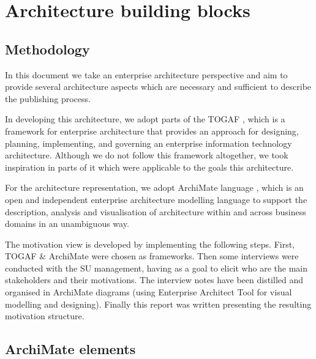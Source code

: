 \section{Architecture building blocks}
\label{sec:building-blocks}


	\subsection{Methodology}
	
	In this document we take an enterprise architecture perspective and aim to provide several architecture aspects which are necessary and sufficient to describe the publishing process. 
	
	In developing this architecture, we adopt parts of the TOGAF \citep{togaf9.2}, which is a framework for enterprise architecture that provides an approach for designing, planning, implementing, and governing an enterprise information technology architecture. Although we do not follow this framework altogether, we took inspiration in parts of it which were applicable to the goals this architecture.  
	
	For the architecture representation, we adopt ArchiMate language \citep{archimate3.1}, which is an open and independent enterprise architecture modelling language to support the description, analysis and visualisation of architecture within and across business domains in an unambiguous way.
	
	The motivation view is developed by implementing the following steps. First, TOGAF \& ArchiMate were chosen as frameworks. Then some interviews were conducted with the SU management, having as a goal to elicit who are the main stakeholders and their motivations. The interview notes have been distilled and organised in ArchiMate diagrams (using Enterprise Architect Tool \citep{ea} for visual modelling and designing). Finally this report was written presenting the resulting motivation structure. 
	
	\subsection{ArchiMate elements}
	

